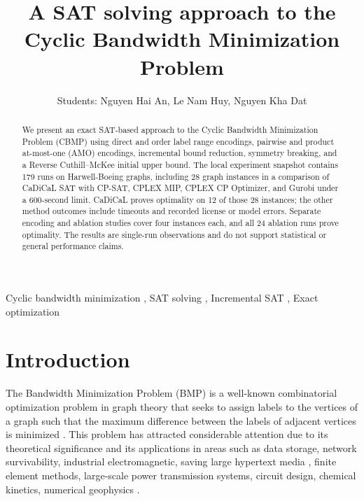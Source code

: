 \documentclass[a4paper,fleqn]{cas-sc}
\begin{document}
\let\WriteBookmarks\relax
\def\floatpagepagefraction{1}
\def\textpagefraction{.001}


\title [mode = title]{A SAT solving approach to the Cyclic Bandwidth Minimization Problem}

\author{Students: Nguyen Hai An, Le Nam Huy, Nguyen Kha Dat}
\begin{abstract}
We present an exact SAT-based approach to the Cyclic Bandwidth Minimization Problem (CBMP) using direct and order label range encodings, pairwise and product at-most-one (AMO) encodings, incremental bound reduction, symmetry breaking, and a Reverse Cuthill--McKee initial upper bound. The local experiment snapshot contains 179 runs on Harwell-Boeing graphs, including 28 graph instances in a comparison of CaDiCaL SAT with CP-SAT, CPLEX MIP, CPLEX CP Optimizer, and Gurobi under a 600-second limit. CaDiCaL proves optimality on 12 of those 28 instances; the other method outcomes include timeouts and recorded license or model errors. Separate encoding and ablation studies cover four instances each, and all 24 ablation runs prove optimality. The results are single-run observations and do not support statistical or general performance claims.
\end{abstract}
\begin{keywords}
    Cyclic bandwidth minimization \sep
    SAT solving \sep
    Incremental SAT \sep
    Exact optimization
\end{keywords}

\maketitle

\section{Introduction}
    The Bandwidth Minimization Problem (BMP) is a well-known combinatorial optimization problem in graph theory that seeks to assign labels to the vertices of a graph such that the maximum difference between the labels of adjacent vertices is minimized \cite{wang:hal-01166658}. This problem has attracted considerable attention due to its theoretical significance and its applications in areas such as data storage, network survivability, industrial electromagnetic, saving large hypertext media \cite{wang:hal-01166658}, finite element methods, large-scale power transmission systems, circuit design, chemical kinetics, numerical geophysics \cite{PINANA2004200}.
\end{document}
